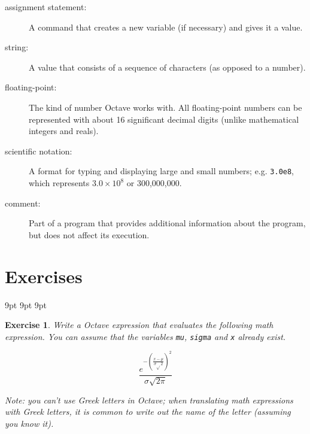 \documentclass{book}
\begin{document}
\begin{description}
\item[assignment statement:] A command that creates a new variable
(if necessary) and gives it a value.

\item[string:] A value that consists of a sequence of characters (as
opposed to a number). 

\item[floating-point:] The kind of number Octave works with. All
floating-point numbers can be represented with about 16 significant
decimal digits (unlike mathematical integers and reals).

\item[scientific notation:] A format for typing and displaying large
and small numbers; e.g. {\tt 3.0e8}, which represents $3.0 \times 10^8$
or 300,000,000. 

\item[comment:] Part of a program that provides additional information
about the program, but does not affect its execution. 

\end{description}


\section{Exercises}

   {9pt}%
   {9pt}%
   {\itshape}%
   {}%
   {\bfseries}%
   {}%
   {9pt}%
   {}%


\theoremstyle{myex}
\newtheorem{ex}{Exercise}[chapter]

\begin{ex}
Write a Octave expression that evaluates the
following math expression. You can assume that the variables
{\tt mu}, {\tt sigma} and {\tt x} already exist.

\begin{equation}
\frac{e^{- \left( \frac{x-\mu}{\sigma \sqrt{}2} \right) ^2}}
{\sigma \sqrt{2 \pi}}
\end{equation}

Note: you can't use Greek letters in Octave; when translating
math expressions with Greek letters, it is common to write out
the name of the letter (assuming you know it).
\end{ex}
\end{document}
